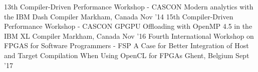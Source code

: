\begin{cventries}
\cventry
  {13th Compiler-Driven Performance Workshop - CASCON}
  {Modern analytics with the IBM Dash Compiler}
  {Markham, Canada}
  {Nov '14}
  {}
\cventry
  {15th Compiler-Driven Performance Workshop - CASCON}
  {GPGPU Offloading with OpenMP 4.5 in the IBM XL Compiler}
  {Markham, Canada}
  {Nov '16}
  {}
\cventry
  {Fourth International Workshop on FPGAS for Software Programmers - FSP}
  {A Case for Better Integration of Host and Target Compilation When Using OpenCL for FPGAs}
  {Ghent, Belgium}
  {Sept '17}
  {}
\end{cventries}
